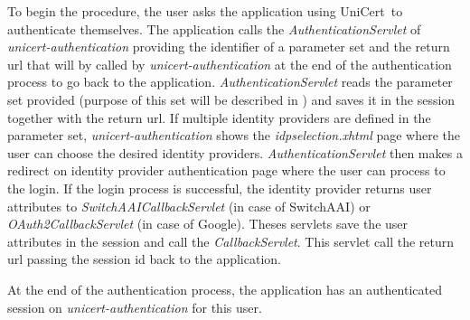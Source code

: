 \documentclass[oneside]{scrreprt}
\newcommand{\unicert}{\mbox{UniCert}}
\begin{document}
To begin the procedure, the user asks the application using \unicert\ to authenticate themselves. The application calls the \textit{AuthenticationServlet} of \textit{unicert-authentication} providing the identifier of a parameter set and the return url that will by called by \textit{unicert-authentication} at the end of the authentication process to go back to the application. \textit{AuthenticationServlet} reads the parameter set provided (purpose of this set will be described in ) and saves it in the session together with the return url. If multiple identity providers are defined in the parameter set, \textit{unicert-authentication} shows the \textit{idpselection.xhtml} page where the user can choose the desired identity providers. \textit{AuthenticationServlet} then makes a redirect on identity provider authentication page where the user can process to the login. If the login process is successful, the identity provider returns user attributes to \textit{SwitchAAICallbackServlet} (in case of SwitchAAI) or \textit{OAuth2CallbackServlet} (in case of Google). Theses servlets save the user attributes in the session and call the \textit{CallbackServlet}. This servlet call the 
return url passing the session id back to the application.

At the end of the authentication process, the application has an authenticated session on \textit{unicert-authentication} for this user.


\end{document}
